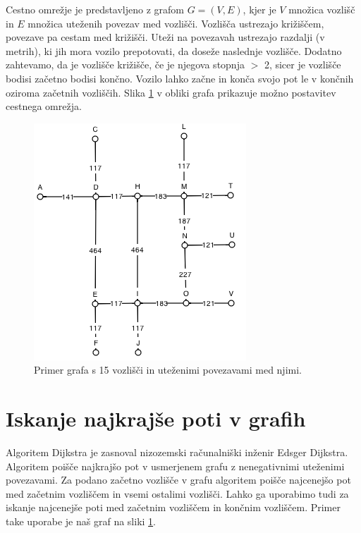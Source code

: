 \documentclass[a4paper, 12pt]{book}
\begin{document}
Cestno omre\v zje je predstavljeno z grafom $G = (V, E)$, kjer je $V$ mno\v zica vozli\v s\v c in $E$ mno\v zica ute\v zenih povezav med vozli\v s\v ci. Vozli\v s\v ca ustrezajo kri\v zi\v s\v cem, povezave pa cestam med kri\v zi\v s\v ci. Ute\v zi na povezavah ustrezajo razdalji (v metrih), ki jih mora vozilo prepotovati, da dose\v ze naslednje vozli\v s\v ce.  Dodatno zahtevamo, da je vozli\v s\v ce kri\v zi\v s\v ce, \v ce je njegova stopnja $>$ 2, sicer je vozli\v s\v ce bodisi za\v cetno bodisi kon\v cno. Vozilo lahko za\v cne in kon\v ca svojo pot le v kon\v cnih oziroma za\v cetnih vozli\v s\v cih. Slika \ref{graph3} v obliki grafa prikazuje mo\v zno postavitev cestnega omre\v zja.
\begin{figure}
\begin{center}
\includegraphics[totalheight=0.4\textheight]{graph3.png}
\end{center}
\caption{Primer grafa s 15 vozli\v s\v ci in ute\v zenimi povezavami med njimi.}
\label{graph3}
\end{figure}

\section{Iskanje najkraj\v se poti v grafih}
\label{seq:dijkstra}
Algoritem Dijkstra je zasnoval nizozemski ra\v cunalni\v ski in\v zenir Edsger Dijkstra. Algoritem poi\v s\v ce najkraj\v so pot v usmerjenem grafu z nenegativnimi ute\v zenimi povezavami. Za podano za\v cetno vozli\v s\v ce v grafu algoritem poi\v s\v ce najcenej\v so pot med za\v cetnim vozli\v s\v cem in vsemi ostalimi vozli\v s\v ci. Lahko ga uporabimo tudi za iskanje najcenej\v se poti med za\v cetnim vozli\v s\v cem in kon\v cnim vozli\v s\v cem. Primer take uporabe je na\v s graf na sliki \ref{graph3}.
\end{document}
